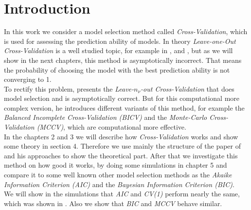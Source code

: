 \documentclass[Research_Module_ES.tex]{subfiles}
\begin{document}
\section{Introduction}	
In this work we consider a model selection method  called \textit{Cross-Validation}, which is used for assessing the prediction ability of models.
In theory \textit{Leave-one-Out Cross-Validation} is a well studied topic, for example in \cite{geisser1975predictive}, \cite{stone1974cross} and \cite{stone1977asymptotic}, but as we will show in the next chapters, this method is asymptotically incorrect. That means the probability of choosing the model with the best prediction ability is not converging to 1.\\
To rectify this problem, \cite{shao} presents the \textit{Leave-$n_\nu$-out Cross-Validation} that does model selection and is asymptotically correct. But for this computational more complex version, he introduces different variants of this method, for example the \textit{Balanced Incomplete Cross-Validation (BICV)} and the \textit{Monte-Carlo Cross-Validation (MCCV)}, which are computational more effective.\\ In the chapters 2 and 3 we will describe how \textit{Cross-Validation} works and show some theory in section 4. Therefore we use mainly the structure of the paper of \cite{shao} and his approaches to show the theoretical part. After that we investigate this method on how good it works, by doing some simulations in chapter 5 and compare it to some well known other model selection methods as the \textit{Akaike Information Criterion (AIC)} and the \textit{Bayesian Information Criterion (BIC)}.\\
We will show in the simulations that \textit{AIC} and \textit{CV(1)} perform nearly the same, which was shown in \cite{stone1977asymptotic}. Also we show that \textit{BIC} and \textit{MCCV} behave similar.
\end{document}
